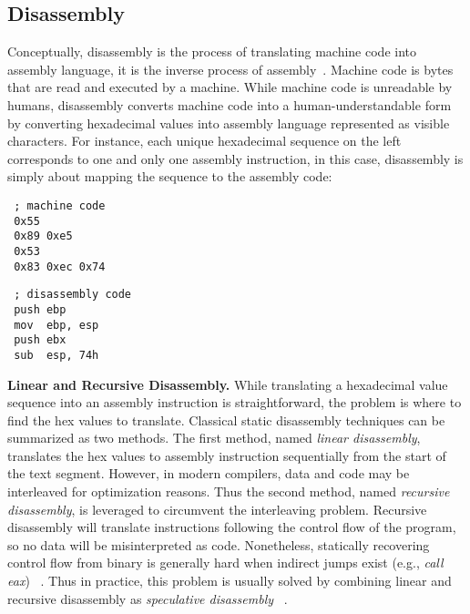 \subsection{Disassembly} \label{subsec:background-disassembly}
Conceptually, disassembly is the process of translating machine code into
assembly language, it is the inverse process of
assembly~\cite{schwarz2002disassembly,wang2015reassembleable,bauman2018superset}.
Machine code is bytes that are read and executed by a machine. While machine
code is unreadable by humans, disassembly converts machine code into a
human-understandable form by converting hexadecimal values into assembly
language represented as visible characters.
For instance, each unique hexadecimal sequence on the left corresponds to one
and only one assembly instruction, in this case, disassembly is simply about
mapping the sequence to the assembly code:

\vspace*{3pt}
\noindent\hspace*{36pt}\begin{minipage}{.40\linewidth}
\begin{lstlisting}
 ; machine code
 0x55
 0x89 0xe5
 0x53
 0x83 0xec 0x74
\end{lstlisting}
\end{minipage}\hspace*{24pt}
\begin{minipage}{.40\linewidth}
\begin{lstlisting}
 ; disassembly code
 push ebp
 mov  ebp, esp
 push ebx
 sub  esp, 74h
\end{lstlisting}
\end{minipage}

\noindent \textbf{Linear and Recursive Disassembly.} While translating a
hexadecimal value sequence into an assembly instruction is straightforward,
the problem is where to find the hex values to translate. Classical static
disassembly techniques can be summarized as two methods. The first method,
named \textit{linear disassembly}, translates the hex values to assembly
instruction sequentially from the start of the text segment. However, in
modern compilers, data and code may be interleaved for optimization reasons.
Thus the second method, named \textit{recursive disassembly}, is leveraged to
circumvent the interleaving problem. Recursive disassembly will translate
instructions following the control flow of the program, so no data will be
misinterpreted as code. Nonetheless, statically recovering control flow from
binary is generally hard when indirect jumps exist (e.g., \textit{call eax})
~\cite{shoshitaishvili2016sok}.
Thus in practice, this problem is usually solved by combining linear and
recursive disassembly as \textit{speculative disassembly}
~\cite{cifuentes2000uqbt}.

